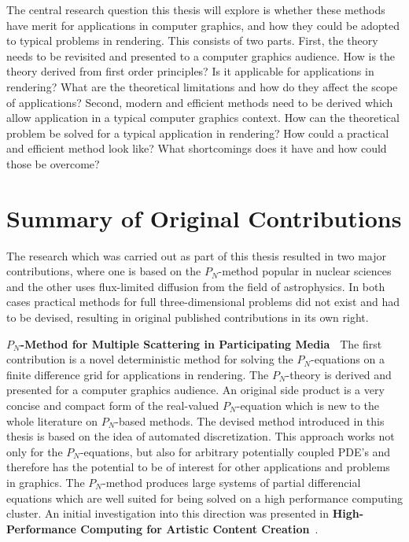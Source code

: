 The central research question this thesis will explore is whether these methods have merit for applications in computer graphics, and how they could be adopted to typical problems in rendering. This consists of two parts. First, the theory needs to be revisited and presented to a computer graphics audience. How is the theory derived from first order principles? Is it applicable for applications in rendering? What are the theoretical limitations and how do they affect the scope of applications? Second, modern and efficient methods need to be derived which allow application in a typical computer graphics context. How can the theoretical problem be solved for a typical application in rendering? How could a practical and efficient method look like? What shortcomings does it have and how could those be overcome?

\section{Summary of Original Contributions}

The research which was carried out as part of this thesis resulted in two major contributions, where one is based on the $P_N$-method popular in nuclear sciences and the other uses flux-limited diffusion from the field of astrophysics. In both cases practical methods for full three-dimensional problems did not exist and had to be devised, resulting in original published contributions in its own right.

\textbf{$P_N$-Method for Multiple Scattering in Participating Media~\cite{Koerner18}} The first contribution is a novel deterministic method for solving the $P_N$-equations on a finite difference grid for applications in rendering. The $P_N$-theory is derived and presented for a computer graphics audience. An original side product is a very concise and compact form of the real-valued $P_N$-equation which is new to the whole literature on $P_N$-based methods. The devised method introduced in this thesis is based on the idea of automated discretization. This approach works not only for the $P_N$-equations, but also for arbitrary potentially coupled PDE's and therefore has the potential to be of interest for other applications and problems in graphics. The $P_N$-method produces large systems of partial differencial equations which are well suited for being solved on a high performance computing cluster. An initial investigation into this direction was presented in \textbf{High-Performance Computing for Artistic Content Creation}~\cite{Koerner17}.

